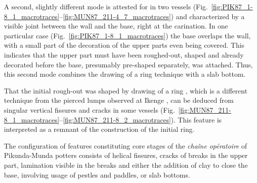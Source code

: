 \documentclass[smallextended,natbib]{svjour3}       %
\begin{document}
A second, slightly different mode is attested for in two vessels (Fig.~\ref{fig:PIK87_1-8_1_macrotraces}--\ref{fig:MUN87_211-4_7_macrotraces}) and characterized by a visible joint between the wall and the base, right at the carination. In one particular case (Fig.~\ref{fig:PIK87_1-8_1_macrotraces}) the base overlaps the wall, with a small part of the decoration of the upper parts even being covered. This indicates that the upper part must have been roughed-out, shaped and already decorated before the base, presumably pre-shaped separately, was attached. Thus, this second mode combines the drawing of a ring technique with a slab bottom.

That the initial rough-out was shaped by drawing of a ring \citep[cf]{LivingstoneSmith.2010a}, which is a different technique from the pierced lumps observed at Ikenge \citep{Eggert.1980c}, can be deduced from singular vertical fissures and cracks in some vessels (Fig.~\ref{fig:MUN87_211-8_1_macrotraces}--\ref{fig:MUN87_211-8_2_macrotraces}). This feature is interpreted as a remnant of the construction of the initial ring.

The configuration of features constituting core stages of the \textit{chaîne opératoire} of Pikunda-Munda potters consists of helical fissures, cracks of breaks in the upper part, lamination visible in the breaks and either the addition of clay to close the base, involving usage of pestles and paddles, or slab bottoms. 
\end{document}
